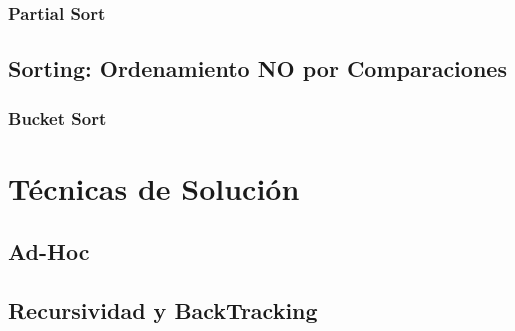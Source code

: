 \documentclass[12pt, fleqn]{report}                             %
\theoremstyle{break}                                            %
\begin{document}
        \section{Partial Sort}


    \clearpage
    \chapter{Sorting: Ordenamiento NO por Comparaciones}
        
        \section{Bucket Sort}


\part{Técnicas de Solución}

\clearpage
\chapter{Ad-Hoc}


\clearpage
\chapter{Recursividad y BackTracking}
\end{document}
